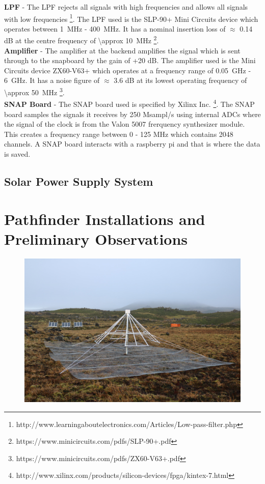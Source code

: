 \documentclass{ws-jai}
\begin{document}
\textbf{LPF} - The LPF rejects all signals with high frequencies and allows all signals with low frequencies \footnote{http://www.learningaboutelectronics.com/Articles/Low-pass-filter.php}. The LPF used is the SLP-90+ Mini Circuits device which operates between \SI{1}{MHz} - \SI{400}{MHz}. It has a nominal insertion loss of $\approx$ 0.14 dB at the centre frequency of  \SI{\approx 10}{MHz} \footnote{https://www.minicircuits.com/pdfs/SLP-90+.pdf}.\\

\textbf{Amplifier} - The amplifier at the backend amplifies the signal which is sent through to the snapboard by the gain of +20 dB. The amplifier used is the Mini Circuits device ZX60-V63+ which operates at a frequency range of \SI{0.05}{GHz} - \SI{6}{GHz}. It has a noise figure of $\approx$ 3.6 dB at its lowest operating frequency of \SI{\approx 50}{MHz} \footnote{https://www.minicircuits.com/pdfs/ZX60-V63+.pdf}.\\

\textbf{SNAP Board} - The SNAP board used is specified by Xilinx Inc. \footnote{http://www.xilinx.com/products/silicon-devices/fpga/kintex-7.html}. The  SNAP board samples the signals it receives by 250 Msampl/s using internal ADCs where the signal of the clock is from the Valon 5007 frerquency synthesizer module. This creates a frequency range between 0 - 125 MHz which contains 2048 channels. A SNAP board interacts with a raspberry pi and that is where the data is saved.\\

\subsection{Solar Power Supply System}



\section{Pathfinder Installations and Preliminary Observations}
	
	\begin{figure}[h]
		\begin{center}
			\includegraphics[width=1\linewidth]{Figures/autonomous.jpg}
			\caption{}
			\label{Fig:autonomous}
		\end{center}
	\end{figure}
	
\end{document}
